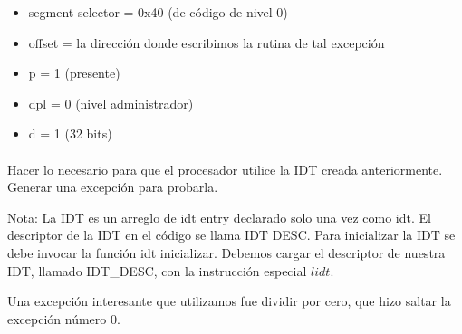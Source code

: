 \begin{itemize}
    \item segment-selector = 0x40 (de código de nivel 0)
    \item offset = la dirección donde escribimos la rutina de tal excepción
    \item p = 1 (presente)
    \item dpl = 0 (nivel administrador) 
    \item d = 1 (32 bits)
\end{itemize}

\paragraph{}\label{subsubsec:ej2-b}
Hacer lo necesario para que el procesador utilice la IDT creada anteriormente.
Generar una excepción para probarla.

Nota: La IDT es un arreglo de idt entry declarado solo una vez como idt. El
descriptor de la IDT en el código se llama IDT DESC. Para inicializar la IDT se
debe invocar la función idt inicializar.
\hruler
Debemos cargar el descriptor de nuestra IDT, llamado IDT\_DESC, con la instrucción especial $lidt$. 

Una excepción interesante que utilizamos fue dividir por cero, que hizo saltar la excepción número 0.
